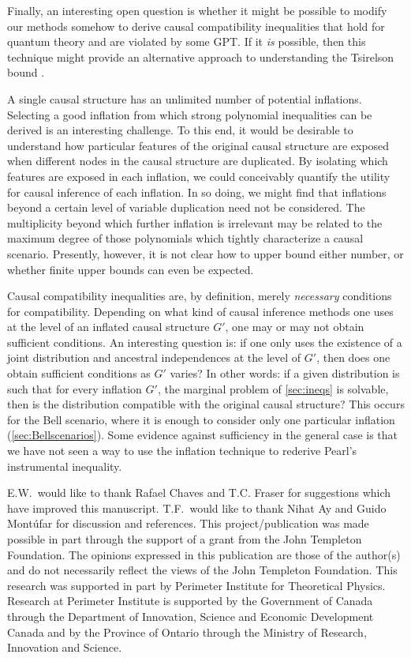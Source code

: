 \documentclass[aps,english,10pt,superscriptaddress,onecolumn,twoside,longbibliography,pra,floatfix,fleqn,nofootinbib]{revtex4-1}
\theoremstyle{definition}
\begin{document}
Finally, an interesting open question is whether it might be possible to modify our methods somehow to derive causal compatibility inequalities that hold for quantum theory and are violated by some GPT.  If it {\em is} possible, then 
this technique might provide an alternative approach to understanding the Tsirelson bound \cite{Brunner2013Bell}.

A single causal structure has an unlimited number of potential inflations. Selecting a good inflation from which strong polynomial inequalities can be derived is an interesting challenge. To this end, it would be desirable to understand how particular features of the original causal structure are exposed when different nodes in the causal structure are duplicated. By isolating which features are exposed in each inflation, we could conceivably quantify the utility for causal inference of each inflation. In so doing, we might find that inflations beyond a certain level of variable duplication need not be considered. The multiplicity beyond which further inflation is irrelevant may be related to the maximum degree of those polynomials which tightly characterize a causal scenario. Presently, however, it is not clear how to upper bound either number, or whether finite upper bounds can even be expected.

Causal compatibility inequalities are, by definition, merely {\em necessary} conditions for compatibility. Depending on what kind of causal inference methods one uses at the level of an inflated causal structure $G'$, one may or may not obtain sufficient conditions. An interesting question is: if one only uses the existence of a joint distribution and ancestral independences at the level of $G'$, then does one obtain sufficient conditions as $G'$ varies? In other words: if a given distribution is such that for every inflation $G'$, the marginal problem of \cref{sec:ineqs} is solvable, then is the distribution compatible with the original causal structure? This occurs for the Bell scenario, where it is enough to consider only one particular inflation (\cref{sec:Bellscenarios}). Some evidence against sufficiency in the general case is that we have not seen a way to use the inflation technique to rederive Pearl's instrumental inequality.

\begin{acknowledgments}
E.W.~would like to thank Rafael Chaves and T.C. Fraser for suggestions which have improved this manuscript. T.F.~would like to thank Nihat Ay and Guido Mont\'ufar for discussion and references. This project/publication was made possible in part through the support of a grant  from the John Templeton Foundation. The opinions expressed in this publication are those of the author(s) and do not necessarily reflect the views of the John Templeton Foundation. This research was supported in part by Perimeter Institute for Theoretical Physics. Research at Perimeter Institute is supported by the Government of Canada through the Department of Innovation, Science and Economic Development Canada and by the Province of Ontario through the Ministry of Research, Innovation and Science.  
\end{acknowledgments}
\end{document}
